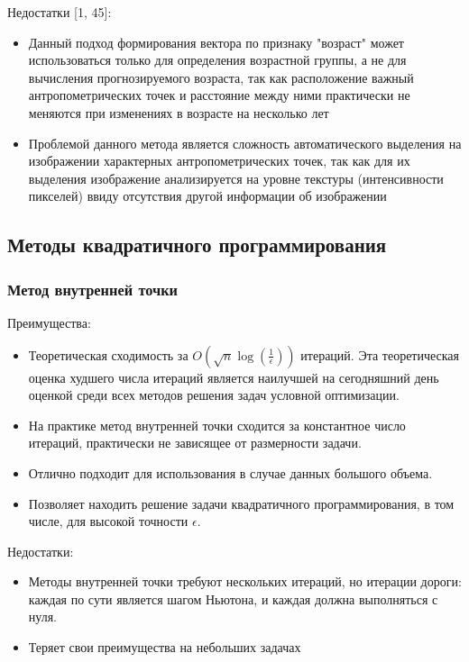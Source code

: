 \documentclass[main.tex]{subfiles}
\begin{document}
Недостатки [1, 45]:
\begin{itemize}
    \item Данный подход формирования вектора по признаку "возраст" может использоваться только для определения возрастной группы, а не для вычисления прогнозируемого возраста, так как расположение важный антропометрических точек и расстояние между ними практически не меняются при изменениях в возрасте на несколько лет
    \item Проблемой данного метода является сложность автоматического выделения на изображении характерных антропометрических точек, так как для их выделения изображение анализируется на уровне текстуры (интенсивности пикселей) ввиду отсутствия другой информации об изображении
\end{itemize}

\subsection{Методы квадратичного программирования}
\subsubsection{Метод внутренней точки}
Преимущества:
\begin{itemize}
	\item Теоретическая сходимость за \textbf{$O(\sqrt{n}\log(\frac{1}{\epsilon}))$}
	итераций. Эта теоретическая оценка худшего числа итераций является наилучшей на сегодняшний день оценкой
	среди всех методов решения задач условной оптимизации.
	\item На практике метод внутренней точки сходится за
	константное число итераций, практически не зависящее от размерности задачи. 
	\item Отлично подходит для использования в случае данных большого объема.
	\item Позволяет находить решение задачи квадратичного программирования, в том числе, для высокой точности $\epsilon$.
\end{itemize}

Недостатки:
\begin{itemize}
	\item Методы внутренней точки требуют нескольких итераций, но итерации дороги: каждая по сути является шагом Ньютона, и каждая должна выполняться с нуля. 
	\item Теряет свои преимущества на небольших задачах 
\end{itemize}
\end{document}
